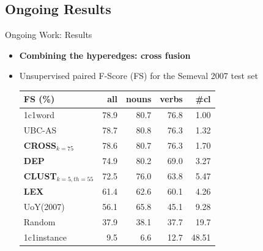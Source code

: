 \subsection{Ongoing Results}


\begin{frame}{Ongoing Work: Results}
\begin{itemize}
	\item \textbf{Combining the hyperedges: cross fusion}
	
		\item[] Unsupervised paired F-Score (FS) for the Semeval 2007 test set
		\centering
\begin{tabular}{@{}lrrrr@{}}
\toprule
\textbf{FS (\%)} & \textbf{all} & \textbf{nouns} & \textbf{verbs} & \textbf{\#cl} \\ \midrule
1c1word          & 78.9         & 80.7           & 76.8           & 1.00             \\
UBC-AS           & 78.7         & 80.8           & 76.3           & 1.32          \\
\textbf{CROSS$_{k=75}$}     & 78.6         & 80.7           & 76.3           & 1.70          \\
\textbf{DEP}     & 74.9         & 80.2           & 69.0           & 3.27          \\
\textbf{CLUST$_{k=5,th=55	}$}    & 72.5          & 76.0           & 63.8  & 5.47          \\
\textbf{LEX}     & 61.4         & 62.6           & 60.1           & 4.26         \\
UoY(2007)        & 56.1         & 65.8           & 45.1           & 9.28          \\
Random           & 37.9         & 38.1           & 37.7           & 19.7             \\
1c1instance & 	9.5         & 6.6           & 12.7           & 48.51             \\ \bottomrule
\end{tabular}

			
		
\end{itemize}


\end{frame}



